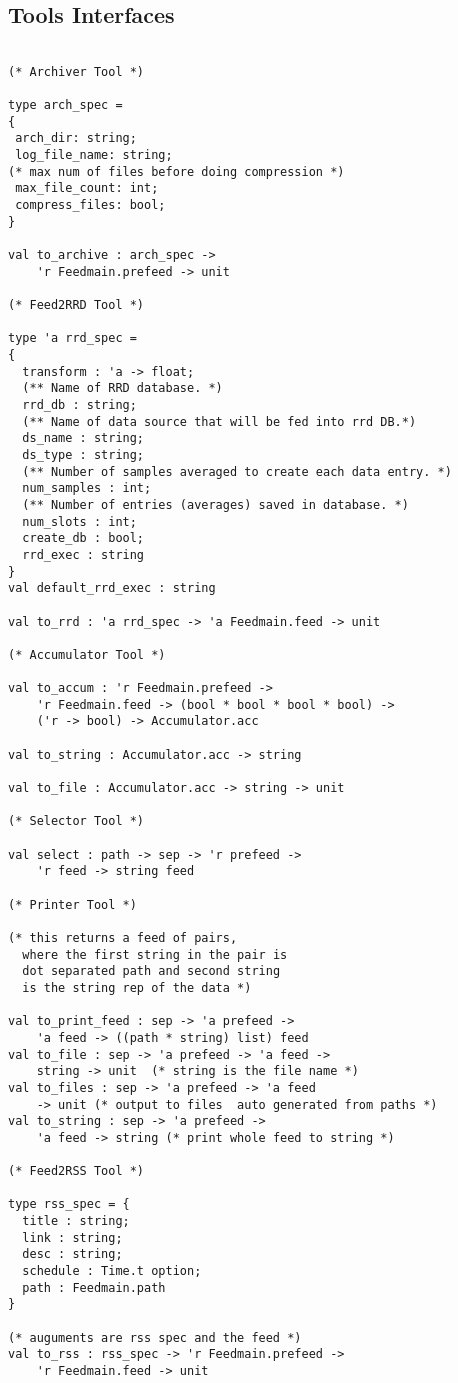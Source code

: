 \subsection{Tools Interfaces}
\begin{verbatim}

(* Archiver Tool *)

type arch_spec =
{
 arch_dir: string;
 log_file_name: string;
(* max num of files before doing compression *)
 max_file_count: int; 
 compress_files: bool;
}

val to_archive : arch_spec -> 
	'r Feedmain.prefeed -> unit

(* Feed2RRD Tool *)

type 'a rrd_spec =
{
  transform : 'a -> float;
  (** Name of RRD database. *)
  rrd_db : string;
  (** Name of data source that will be fed into rrd DB.*)
  ds_name : string;
  ds_type : string;
  (** Number of samples averaged to create each data entry. *)
  num_samples : int;
  (** Number of entries (averages) saved in database. *)
  num_slots : int;
  create_db : bool;
  rrd_exec : string
}
val default_rrd_exec : string

val to_rrd : 'a rrd_spec -> 'a Feedmain.feed -> unit

(* Accumulator Tool *)

val to_accum : 'r Feedmain.prefeed -> 
	'r Feedmain.feed -> (bool * bool * bool * bool) -> 
	('r -> bool) -> Accumulator.acc

val to_string : Accumulator.acc -> string

val to_file : Accumulator.acc -> string -> unit

(* Selector Tool *)

val select : path -> sep -> 'r prefeed -> 
	'r feed -> string feed

(* Printer Tool *)

(* this returns a feed of pairs, 
  where the first string in the pair is 
  dot separated path and second string 
  is the string rep of the data *)

val to_print_feed : sep -> 'a prefeed -> 
	'a feed -> ((path * string) list) feed
val to_file : sep -> 'a prefeed -> 'a feed -> 
	string -> unit  (* string is the file name *)
val to_files : sep -> 'a prefeed -> 'a feed 
	-> unit (* output to files  auto generated from paths *)
val to_string : sep -> 'a prefeed -> 
	'a feed -> string (* print whole feed to string *)

(* Feed2RSS Tool *)

type rss_spec = {
  title : string;
  link : string;
  desc : string;
  schedule : Time.t option;
  path : Feedmain.path
}

(* auguments are rss spec and the feed *)
val to_rss : rss_spec -> 'r Feedmain.prefeed -> 
	'r Feedmain.feed -> unit

\end{verbatim}
